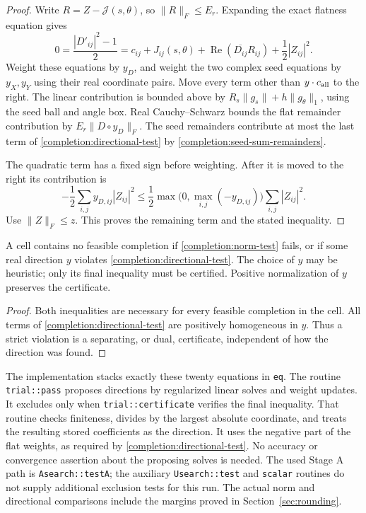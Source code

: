 \begin{proof}
Write $R=Z-\mathcal J(s,\theta)$, so
$\lVert R\rVert_F\le E_r$.  Expanding the exact flatness equation gives
\[
 0=\frac{|D'_{ij}|^2-1}{2}
   =c_{ij}+J_{ij}(s,\theta)
    +\operatorname{Re}(\overline{D_{ij}}R_{ij})
    +\frac12|Z_{ij}|^2.
\]
Weight these equations by $y_D$, and weight the two complex seed equations
by $y_X,y_Y$ using their real coordinate pairs.  Move every term other than
$y\cdot c_{\rm all}$ to the right.
The linear contribution is bounded above by
$R_s\lVert g_s\rVert+h\lVert g_\theta\rVert_1$, using the seed ball and
angle box.  Real Cauchy--Schwarz bounds the flat remainder contribution by
$E_r\lVert D\circ y_D\rVert_F$.  The seed remainders contribute at most
the last term of \eqref{completion:directional-test} by
\eqref{completion:seed-sum-remainders}.

The quadratic term has a fixed sign before weighting.  After it is moved
to the right its contribution is
\[
 -\frac12\sum_{i,j}y_{D,ij}|Z_{ij}|^2
 \le\frac12\max\big(0,\max_{i,j}(-y_{D,ij})\big)
               \sum_{i,j}|Z_{ij}|^2.
\]
Use $\lVert Z\rVert_F\le z$.  This proves the remaining term and the
stated inequality.
\end{proof}

\begin{corollary}
\label{completion:dual-certificates}
A cell contains no feasible completion if
\eqref{completion:norm-test} fails, or if some real direction $y$ violates
\eqref{completion:directional-test}.  The choice of $y$ may be heuristic;
only its final inequality must be certified.  Positive normalization of
$y$ preserves the certificate.
\end{corollary}

\begin{proof}
Both inequalities are necessary for every feasible completion in the cell.
All terms of \eqref{completion:directional-test} are positively homogeneous
in $y$.  Thus a strict violation is a separating, or dual, certificate,
independent of how the direction was found.
\end{proof}

The implementation stacks exactly these twenty equations in \texttt{eq}.
The routine \texttt{trial::pass} proposes directions by regularized linear
solves and weight updates.  It excludes only when
\texttt{trial::certificate} verifies the final inequality.  That routine
checks finiteness, divides by the largest absolute coordinate, and treats
the resulting stored coefficients as the direction.  It uses the negative
part of the flat weights, as required by
\eqref{completion:directional-test}.  No accuracy or convergence assertion
about the proposing solves is needed.  The used Stage A path is
\texttt{Asearch::testA}; the auxiliary \texttt{Usearch::test} and
\texttt{scalar} routines do not supply additional exclusion tests for this
run.  The actual norm and directional comparisons include the margins
proved in Section~\ref{sec:rounding}.


